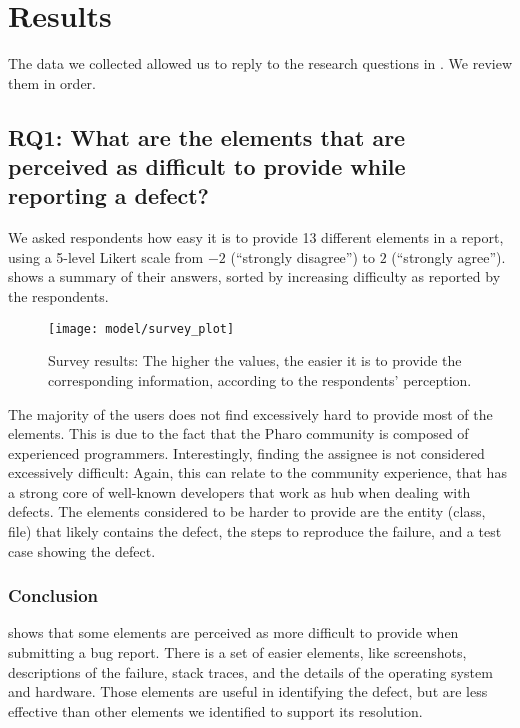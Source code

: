 \section{Results}\label{sec:model-approach}

The data we collected allowed us to reply to the research questions in .
We review them in order.

\subsection*{RQ1: What are the elements that are perceived as difficult to provide while reporting a defect?}

We asked respondents how easy it is to provide 13 different elements in a report, using a 5-level Likert scale from $-2$ (``strongly disagree'') to $2$ (``strongly agree'').
 shows a summary of their answers, sorted by increasing difficulty as reported by the respondents.
%
\begin{figure}[t]
\centering
\texttt{[image: model/survey\_plot]}
\caption{Survey results: The higher the values, the easier it is to provide the corresponding information, according to the respondents' perception.}
\label{fig:survey}
\end{figure}
%
The majority of the users does not find excessively hard to provide most of the elements.
This is due to the fact that the Pharo community is composed of experienced programmers.
Interestingly, finding the assignee is not considered excessively difficult: Again, this can relate to the community experience, that has a strong core of well-known developers that work as hub when dealing with defects.
The elements considered to be harder to provide are the entity (\eg class, file) that likely contains the defect, the steps to reproduce the failure, and a test case showing the defect.


\subsubsection{Conclusion}

 shows that some elements are perceived as more difficult to provide when submitting a bug report.
There is a set of easier elements, like screenshots, descriptions of the failure, stack traces, and the details of the operating system and hardware.
Those elements are useful in identifying the defect, but are less effective than other elements we identified to support its resolution.


